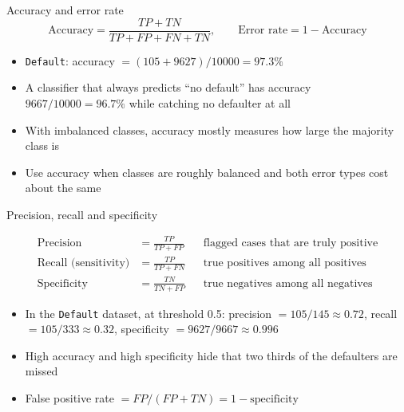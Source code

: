 \begin{frame}{Accuracy and error rate}
    \[
        \text{Accuracy} = \frac{TP + TN}{TP + FP + FN + TN},
        \qquad
        \text{Error rate} = 1 - \text{Accuracy}
    \]
    \begin{itemize}
        \item \texttt{Default}: accuracy $= (105 + 9627)/10000 = 97.3\%$
        \item A classifier that always predicts ``no default'' has accuracy $9667/10000 = 96.7\%$ while catching no defaulter at all
        \item With imbalanced classes, accuracy mostly measures how large the majority class is
        \item Use accuracy when classes are roughly balanced and both error types cost about the same
    \end{itemize}
\end{frame}


\begin{frame}{Precision, recall and specificity}

    {\setlength{\abovedisplayskip}{2pt}\setlength{\belowdisplayskip}{2pt}
    \begin{align*}
        \text{Precision} &= \frac{TP}{TP + FP}
            && \text{flagged cases that are truly positive} \\
        \text{Recall (sensitivity)} &= \frac{TP}{TP + FN}
            && \text{true positives among all positives} \\
        \text{Specificity} &= \frac{TN}{TN + FP}
            && \text{true negatives among all negatives}
    \end{align*}}

    \svspace{0.5em}
    
    \begin{itemize}
        \item In the \texttt{Default} dataset, at threshold 0.5: precision $= 105/145 \approx 0.72$, recall $= 105/333 \approx 0.32$, specificity $= 9627/9667 \approx 0.996$
        \item High accuracy and high specificity hide that two thirds of the defaulters are missed
        \item False positive rate $= FP/(FP + TN) = 1 - \text{specificity}$
    \end{itemize}
\end{frame}



